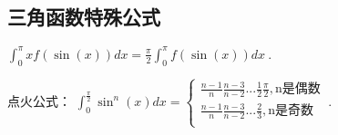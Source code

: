 \subsection{三角函数特殊公式}
$\int ^\pi_0 x f(\sin(x))dx = \frac{\pi}{2}\int ^\pi_0 f(\sin(x))dx~.$

点火公式：
$
\int ^{\frac{\pi}{2}}_{0} \sin^n(x) dx= 
\left \{
\begin{aligned}
\frac{n-1}{n} \frac{n-3}{n-2}...\frac{1}{2} \frac{\pi}{2},\text{n是偶数}\\
\frac{n-1}{n} \frac{n-3}{n-2}...\frac{2}{3},\text{n是奇数}\\
\end{aligned}~.
\right.
$
